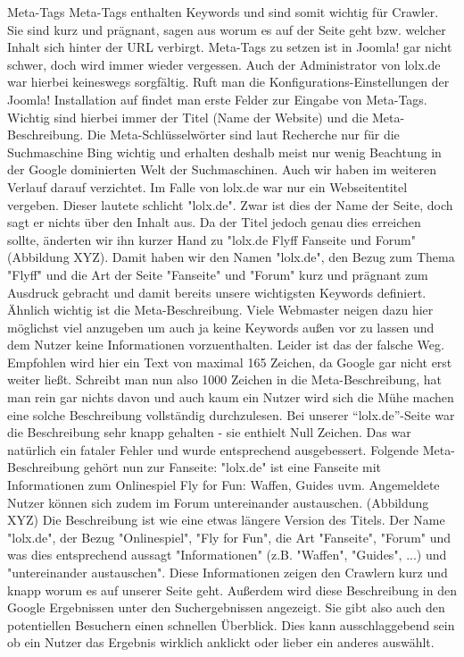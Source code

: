 Meta-Tags
Meta-Tags enthalten Keywords und sind somit wichtig für Crawler. Sie sind kurz und prägnant, sagen aus worum es auf der Seite geht bzw. welcher Inhalt sich hinter der URL verbirgt.
Meta-Tags zu setzen ist in Joomla! gar nicht schwer, doch wird immer wieder vergessen. Auch der Administrator von lolx.de war hierbei keineswegs sorgfältig. Ruft man die Konfigurations-Einstellungen der Joomla! Installation auf findet man erste Felder zur Eingabe von Meta-Tags. Wichtig sind hierbei immer der Titel (Name der Website) und die Meta-Beschreibung. Die Meta-Schlüsselwörter sind laut Recherche nur für die Suchmaschine Bing wichtig und erhalten deshalb meist nur wenig Beachtung in der Google dominierten Welt der Suchmaschinen. Auch wir haben im weiteren Verlauf darauf verzichtet.
Im Falle von lolx.de war nur ein Webseitentitel vergeben. Dieser lautete schlicht "lolx.de". Zwar ist dies der Name der Seite, doch sagt er nichts über den Inhalt aus. Da der Titel jedoch genau dies erreichen sollte, änderten wir ihn kurzer Hand zu "lolx.de Flyff Fanseite und Forum" (Abbildung XYZ). Damit haben wir den Namen "lolx.de", den Bezug zum Thema "Flyff" und die Art der Seite "Fanseite" und "Forum" kurz und prägnant zum Ausdruck gebracht und damit bereits unsere wichtigsten Keywords definiert.
Ähnlich wichtig ist die Meta-Beschreibung. Viele Webmaster neigen dazu hier möglichst viel anzugeben um auch ja keine Keywords außen vor zu lassen und dem Nutzer keine Informationen vorzuenthalten. Leider ist das der falsche Weg. Empfohlen wird hier ein Text von maximal 165 Zeichen, da Google gar nicht erst weiter ließt. Schreibt man nun also 1000 Zeichen in die Meta-Beschreibung, hat man rein gar nichts davon und auch kaum ein Nutzer wird sich die Mühe machen eine solche Beschreibung vollständig durchzulesen.
Bei unserer “lolx.de”-Seite war die Beschreibung sehr knapp gehalten - sie enthielt Null Zeichen. Das war natürlich ein fataler Fehler und wurde entsprechend ausgebessert. Folgende Meta-Beschreibung gehört nun zur Fanseite:
"lolx.de" ist eine Fanseite mit Informationen zum Onlinespiel Fly for Fun: Waffen, Guides uvm. Angemeldete Nutzer können sich zudem im Forum untereinander austauschen. (Abbildung XYZ)
Die Beschreibung ist wie eine etwas längere Version des Titels. Der Name "lolx.de", der Bezug "Onlinespiel", "Fly for Fun", die Art "Fanseite", "Forum" und was dies entsprechend aussagt "Informationen" (z.B. "Waffen", "Guides", ...) und "untereinander austauschen". Diese Informationen zeigen den Crawlern kurz und knapp worum es auf unserer Seite geht. Außerdem wird diese Beschreibung in den Google Ergebnissen unter den Suchergebnissen angezeigt. Sie gibt also auch den potentiellen Besuchern einen schnellen Überblick. Dies kann ausschlaggebend sein ob ein Nutzer das Ergebnis wirklich anklickt oder lieber ein anderes auswählt.

